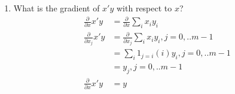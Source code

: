\documentclass[12pt,letter]{article}
\begin{document}
\begin{enumerate}
  
\item What is the gradient of $x'y$ with respect to $x$?
  \begin{align*}
    \frac{\partial}{\partial x} x'y &= \frac{\partial}{\partial x} \sum_i x_i y_i\\
    \frac{\partial}{\partial x_j} x'y &= \frac{\partial}{\partial x_j} \sum_i x_i y_i, j =0,..m-1\\
                                    &= \sum_i 1_{j=i}(i)y_i, j =0,..m-1\\
                                    &= y_j, j =0,..m-1\\
    \frac{\partial}{\partial x} x'y &= y\\
  \end{align*}


\end{enumerate}
\end{document}
